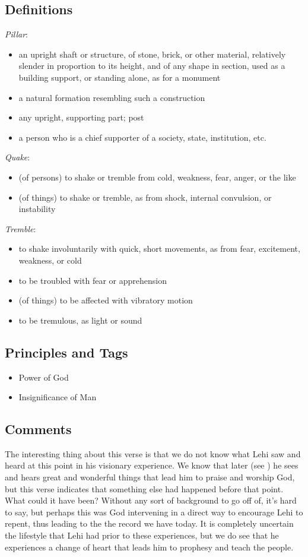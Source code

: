 \documentclass[12pt]{report}
\begin{document}
\subsection{Definitions\label{1Nephi1:6:DFN}}
\emph{Pillar}: \begin{itemize}
\item an upright shaft or structure, of stone, brick, or other material, relatively slender in proportion to its height, and of any shape in section, used as a building support, or standing alone, as for a monument
\item a natural formation resembling such a construction
\item any upright, supporting part; post
\item a person who is a chief supporter of a society, state, institution, etc.
\end{itemize}
\emph{Quake}: \begin{itemize}
\item (of persons) to shake or tremble from cold, weakness, fear, anger, or the like
\item (of things) to shake or tremble, as from shock, internal convulsion, or instability
\end{itemize}
\emph{Tremble}: \begin{itemize}
\item to shake involuntarily with quick, short movements, as from fear, excitement, weakness, or cold \item to be troubled with fear or apprehension
\item (of things) to be affected with vibratory motion
\item to be tremulous, as light or sound
\end{itemize}

\subsection{Principles and Tags\label{1Nephi1:6:principles}}
\begin{itemize}
\item {}Power of God
\item {}Insignificance of Man
\end{itemize}

\subsection{Comments\label{1Nephi1:6:comments}}
The interesting thing about this verse is that we do not know what Lehi saw and heard at this point in his visionary experience.  We know that later (see ) he sees and hears great and wonderful things that lead him to praise and worship God, but this verse indicates that something else had happened before that point.  What could it have been?  Without any sort of background to go off of, it's hard to say, but perhaps this was God intervening in a direct way to encourage Lehi to repent, thus leading to the the record we have today.  It is completely uncertain the lifestyle that Lehi had prior to these experiences, but we do see that he experiences a change of heart that leads him to prophesy and teach the people.
\end{document}
